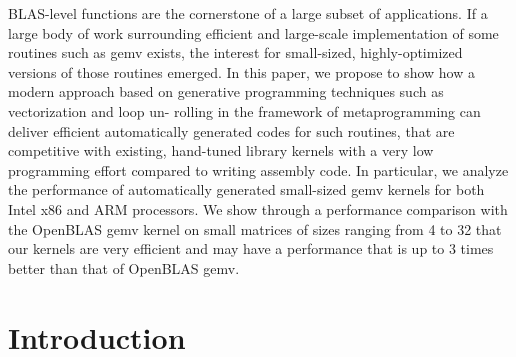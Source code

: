 \documentclass[../../main.tex]{subfiles}
\begin{document}
BLAS-level functions are the cornerstone of a large
subset of applications. If a large body of work surrounding
efficient and large-scale implementation of some routines such
as gemv exists, the interest for small-sized, highly-optimized
versions of those routines emerged. In this paper, we propose
to show how a modern \cpp approach based on generative
programming techniques such as vectorization and loop un-
rolling in the framework of metaprogramming can deliver
efficient automatically generated codes for such routines, that
are competitive with existing, hand-tuned library kernels with
a very low programming effort compared to writing assembly
code. In particular, we analyze the performance of automatically
generated small-sized gemv kernels for both Intel x86 and ARM
processors. We show through a performance comparison with
the OpenBLAS gemv kernel on small matrices of sizes ranging
from 4 to 32 that our \cpp kernels are very efficient and may
have a performance that is up to 3 times better than that of
OpenBLAS gemv.

\section{Introduction}
\end{document}
